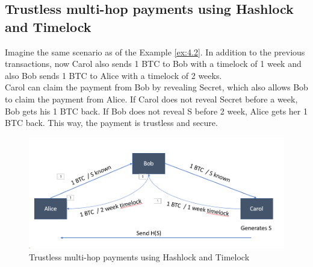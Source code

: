 \documentclass{report}
\begin{document}
\subsection{Trustless multi-hop payments using Hashlock and Timelock}
Imagine the same scenario as of the Example \ref{ex:4.2}. In addition to the previous transactions, now Carol also sends 1 BTC to Bob with a timelock of 1 week and also Bob sends 1 BTC to Alice with a timelock of 2 weeks. \\
Carol can claim the payment from Bob by revealing Secret, which also allows Bob to claim the payment from Alice. If Carol does not reveal Secret before a week, Bob gets his 1 BTC back. If Bob does not reveal S before 2 week, Alice gets her 1 BTC back. This way, the payment is trustless and secure.
\begin{figure}[h!]
	\centering
	\includegraphics[width=0.6\linewidth]{Fig/F7}
	\caption{Trustless multi-hop payments using Hashlock and Timelock}
	\label{fig:f7}
\end{figure}
\end{document}
